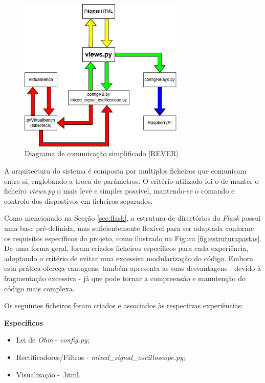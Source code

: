 \begin{figure}[hbtp]
	\centering
	\includegraphics[width=0.7\textwidth]{figures/Diagrama_simplificado.drawio.png}
	\caption{Diagrama de comunicação simplificado [REVER]}
	\label{fig:diagramasimplificado}
\end{figure}

A arquitectura do sistema é composta por multiplos ficheiros que comunicam entre si, englobando a troca de parâmetros. O critério utilizado foi o de manter o ficheiro \textit{views.py} o mais leve e simples possível, mantendo-se o comando e controlo dos dispostivos em ficheiros separados.

Como mencionado na Secção \ref{sec:flask}, a estrutura de directórios do \textit{Flask} possui uma base pré-definida, mas suficientemente flexível para ser adaptada conforme os requisitos específicos do projeto, como ilustrado na Figura \ref{fig:estruturapastas}. De uma forma geral, foram criados ficheiros específicos para cada experiência, adoptando o critério de evitar uma excessiva modularização do código. Embora esta prática ofereça vantagens, também apresenta as suas desvantagens - devido à fragmentação excessiva - já que pode tornar a compreensão e manutenção do código mais complexa.

Os seguintes ficheiros foram criados e associados às respectivas experiências:

\textbf{Específicos}
\begin{itemize}
	\item Lei de \textit{Ohm} - \textit{config.py};
	\item Rectificadores/Filtros - \textit{mixed\_signal\_oscilloscope.py};
	\item Visualização - .html.
\end{itemize}

